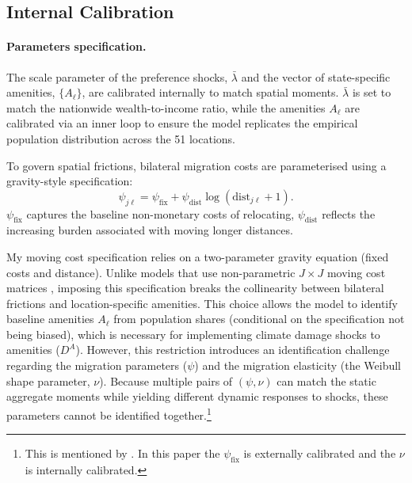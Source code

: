 \documentclass[12pt, a4paper]{article}
\begin{document}
\subsection{Internal Calibration}

\paragraph{Parameters specification.} The scale parameter of the preference shocks, $\bar{\lambda}$  and the vector of state-specific amenities, $\{A_\ell\}$, are calibrated internally to match spatial moments. $\bar{\lambda}$ is set to match the nationwide wealth-to-income ratio, while the amenities $A_\ell$ are calibrated via an inner loop to ensure the model replicates the empirical population distribution across the 51 locations. 

To govern spatial frictions, bilateral migration costs are parameterised using a gravity-style specification: \begin{equation}
  \psi_{j\ell} = \psi_{\text{fix}} + \psi_{\text{dist}} \log(\text{dist}_{j\ell} + 1).
\end{equation}
$\psi_{\text{fix}}$ captures the baseline non-monetary costs of relocating, $\psi_{\text{dist}}$ reflects the increasing burden associated with moving longer distances. 

My moving cost specification relies on a two-parameter gravity equation (fixed costs and distance). Unlike models that use non-parametric $J \times J$ moving cost matrices \citep[e.g.,][]{dvorkin_geography_2025}, imposing this specification breaks the collinearity between bilateral frictions and location-specific amenities. This choice allows the model to identify baseline amenities $A_\ell$ from population shares (conditional on the specification not being biased), which is necessary for implementing climate damage shocks to amenities ($D^A$). However, this restriction introduces an identification challenge regarding the migration parameters ($\psi$) and the migration elasticity (the Weibull shape parameter, $\nu$). Because multiple pairs of $(\psi, \nu)$ can match the static aggregate moments while yielding different dynamic responses to shocks, these parameters cannot be identified together.\footnote{This is mentioned by \citet{sun_wealth_2025}. In this paper the $\psi_{\text{fix}}$ is externally calibrated and the $\nu$ is internally calibrated.}
\end{document}
